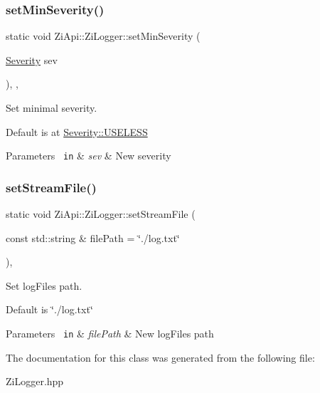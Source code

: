 \subsubsection{\texorpdfstring{setMinSeverity()}{setMinSeverity()}}
{\footnotesize\ttfamily static void Zi\+Api\+::\+Zi\+Logger\+::set\+Min\+Severity (\begin{DoxyParamCaption}\item[{\mbox{\hyperlink{classZiApi_1_1ZiLogger_a483a2cb1e6000a67acba1c903f780225}{Severity}}}]{sev }\end{DoxyParamCaption})\hspace{0.3cm}{\ttfamily [inline]}, {\ttfamily [static]}, {\ttfamily [noexcept]}}



Set minimal severity. 

Default is at \mbox{\hyperlink{classZiApi_1_1ZiLogger_a483a2cb1e6000a67acba1c903f780225aa85f1b757c08be14396a953d5faa53d8}{Severity\+::\+U\+S\+E\+L\+E\+SS}} 
\begin{DoxyParams}[1]{Parameters}
\mbox{\texttt{ in}}  & {\em sev} & New severity \\
\hline
\end{DoxyParams}
\mbox{\label{classZiApi_1_1ZiLogger_a38ec94a0c7bbcb8ffbb0b76bd255c748}} 
\subsubsection{\texorpdfstring{setStreamFile()}{setStreamFile()}}
{\footnotesize\ttfamily static void Zi\+Api\+::\+Zi\+Logger\+::set\+Stream\+File (\begin{DoxyParamCaption}\item[{const std\+::string \&}]{file\+Path = {\ttfamily \char`\"{}./log.txt\char`\"{}} }\end{DoxyParamCaption})\hspace{0.3cm}{\ttfamily [inline]}, {\ttfamily [static]}}



Set log\+File\textquotesingle{}s path. 

Default is \char`\"{}./log.\+txt\char`\"{} 
\begin{DoxyParams}[1]{Parameters}
\mbox{\texttt{ in}}  & {\em file\+Path} & New log\+File\textquotesingle{}s path \\
\hline
\end{DoxyParams}


The documentation for this class was generated from the following file\+:\begin{DoxyCompactItemize}
\item 
Zi\+Logger.\+hpp\end{DoxyCompactItemize}
